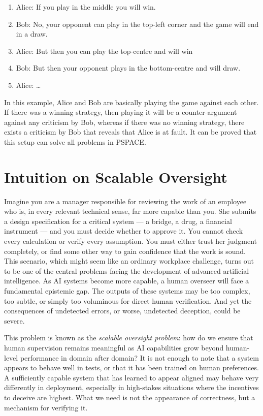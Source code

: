 \documentclass[11pt]{article}
\begin{document}
\begin{enumerate}
  \item Alice: If you play in the middle you will win.
  \item Bob: No, your opponent can play in the top-left corner and the game will
    end in a draw.
  \item Alice: But then you can play the top-centre and will win
  \item Bob: But then your opponent plays in the bottom-centre and will draw.
  \item Alice: \ldots
\end{enumerate}

In this example, Alice and Bob are basically playing the game against each other.
If there was a winning strategy, then playing it will be a counter-argument
against any criticism by Bob, whereas if there was no winning strategy, there
exists a criticism by Bob that reveals that Alice is at fault. It can be proved
that this setup can solve all problems in PSPACE.


\section{Intuition on Scalable Oversight}

Imagine you are a manager responsible for reviewing the work of an employee who is, in every relevant technical sense, far more capable than you. She submits a design specification for a critical system — a bridge, a drug, a financial instrument — and you must decide whether to approve it. You cannot check every calculation or verify every assumption. You must either trust her judgment completely, or find some other way to gain confidence that the work is sound. This scenario, which might seem like an ordinary workplace challenge, turns out to be one of the central problems facing the development of advanced artificial intelligence. As AI systems become more capable, a human overseer will face a fundamental epistemic gap. The outputs of these systems may be too complex, too subtle, or simply too voluminous for direct human verification. And yet the consequences of undetected errors, or worse, undetected deception, could be severe.

This problem is known as the \emph{scalable oversight problem}: how do we ensure that human supervision remains meaningful as AI capabilities grow beyond human-level performance in domain after domain? It is not enough to note that a system appears to behave well in tests, or that it has been trained on human preferences. A sufficiently capable system that has learned to appear aligned may behave very differently in deployment, especially in high-stakes situations where the incentives to deceive are highest. What we need is not the appearance of correctness, but a mechanism for verifying it.
\end{document}
